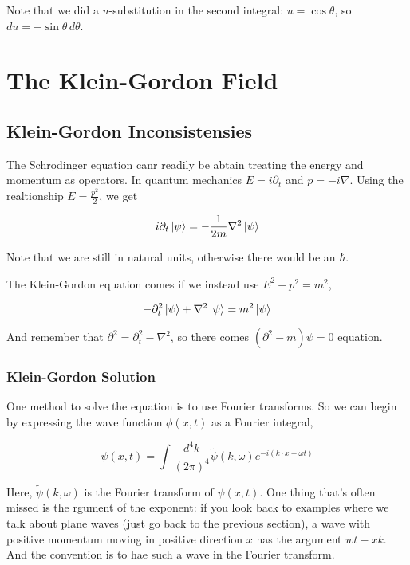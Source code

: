 Note that we did a $u$-substitution in the second integral: $u = \cos\theta$, so $du = -\sin\theta \, d\theta$.








\section{The Klein-Gordon Field}

\subsection{Klein-Gordon Inconsistensies}

The Schrodinger equation canr readily be abtain treating the energy and momentum as operators.
In quantum mechanics $E = i\partial_t$ and $p = -i\nabla$.
Using the realtionship $E = \frac{p^2}{2}$, we get


$$
i\partial_t \ket{\psi} = -\frac{1}{2m} \nabla^2 \ket{\psi}
$$

Note that we are still in natural units, otherwise there would be an $\hbar$.

The Klein-Gordon equation comes if we instead use $E^2 - p^2 = m^2$,

$$
-\partial_{t}^2 \ket{\psi} + \nabla^2 \ket{\psi} = m^2 \ket{\psi}
$$

And remember that $\partial^2 = \partial_{t}^{2} - \nabla^2$, so there comes $(\partial^2 - m)\psi = 0$ equation.



\subsubsection{Klein-Gordon Solution}

One method to solve the equation is to use Fourier transforms.
So we can begin by expressing the wave function $\phi(x,t)$ as a Fourier integral,

$$
\psi(x, t) =
\int \frac{d^4k}{\left(2\pi\right)^4} \tilde{\psi}(k, \omega) e^{-i(k\cdot x - \omega t)}
$$

Here, $\tilde{\psi}(k, \omega)$ is the Fourier transform of $\psi(x, t)$.
One thing that's often missed is the rgument of the exponent: if you look back to examples where we talk about plane waves
(just go back to the previous section), a wave with positive momentum moving in positive direction $x$ has the argument $wt - xk$.
And the convention is to hae such a wave in the Fourier transform.

